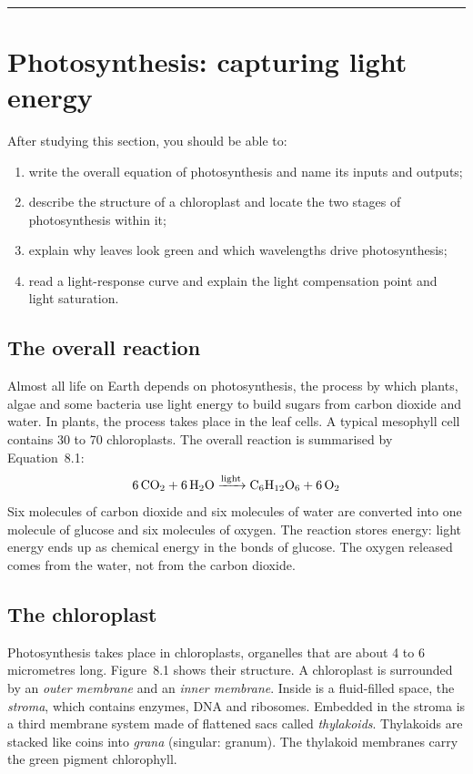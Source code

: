 \documentclass[11pt,a4paper]{article}
\begin{document}
\\[-0.4em]
{\color{leaf}\rule{\linewidth}{0.8pt}}
\section{Photosynthesis: capturing light energy}

\begin{tcolorbox}[colback=leaflight, colframe=leaf, boxrule=0.6pt, arc=2pt, left=8pt, right=8pt, top=5pt, bottom=5pt,
  title={\sffamily\bfseries Learning objectives}, fonttitle=\sffamily, coltitle=white, colbacktitle=leaf]
After studying this section, you should be able to:
\begin{enumerate}[leftmargin=1.6em, itemsep=0.1em, label=\textbf{\arabic*.}]
  \item write the overall equation of photosynthesis and name its inputs and outputs;
  \item describe the structure of a chloroplast and locate the two stages of photosynthesis within it;
  \item explain why leaves look green and which wavelengths drive photosynthesis;
  \item read a light-response curve and explain the light compensation point and light saturation.
\end{enumerate}
\end{tcolorbox}

\subsection{The overall reaction}
Almost all life on Earth depends on photosynthesis, the process by which plants, algae and some bacteria use light
energy to build sugars from carbon dioxide and water. In plants, the process takes place in the leaf cells. A typical
mesophyll cell contains 30 to 70 chloroplasts. The overall reaction is summarised by Equation~8.1:
\begin{equation}
  \ce{6 CO2 + 6 H2O ->[\text{light}] C6H12O6 + 6 O2}
\end{equation}
Six molecules of carbon dioxide and six molecules of water are converted into one molecule of glucose and six molecules of
oxygen. The reaction stores energy: light energy ends up as chemical energy in the bonds of glucose. The oxygen
released comes from the water, not from the carbon dioxide.

\subsection{The chloroplast}
Photosynthesis takes place in chloroplasts, organelles that are about 4 to 6 micrometres long. Figure~8.1 shows their
structure. A chloroplast is surrounded by an \emph{outer membrane} and an \emph{inner membrane}. Inside is a fluid-filled
space, the \emph{stroma}, which contains enzymes, DNA and ribosomes. Embedded in the stroma is a third membrane system
made of flattened sacs called \emph{thylakoids}. Thylakoids are stacked like coins into \emph{grana} (singular:
granum). The thylakoid membranes carry the green pigment chlorophyll.
\end{document}
